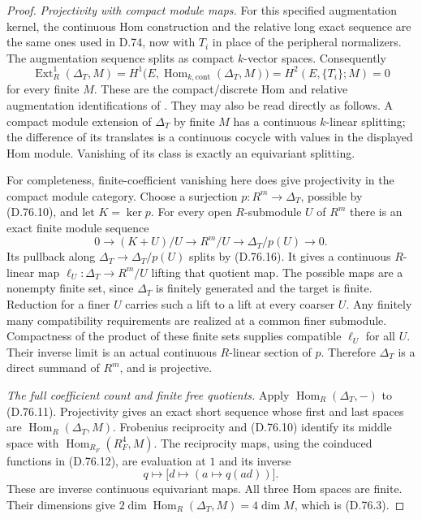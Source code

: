 \begin{proof}
\emph{Projectivity with compact module maps.}
For this specified augmentation kernel, the continuous
Hom construction and the relative long exact sequence
are the same ones used in D.74, now with $T_i$ in place
of the peripheral normalizers. The augmentation sequence
splits as compact $k$-vector spaces. Consequently
\[
 \operatorname{Ext}^1_R(\Delta_T,M)
   =H^1\bigl(E,\operatorname{Hom}_{k,\mathrm{cont}}(\Delta_T,M)\bigr)
   =H^2(E,\{T_i\};M)=0
                                                               \tag{D.76.16}
\]
for every finite $M$.
These are the compact/discrete Hom and relative
augmentation identifications of
\cite[Section~1 and Definition~2.1]{C-WilkesRelativeAccepted2018}.
They may also be read directly as follows. A compact
module extension of $\Delta_T$ by finite $M$ has a
continuous $k$-linear splitting; the difference of its
translates is a continuous cocycle with values in the
displayed Hom module. Vanishing of its class is
exactly an equivariant splitting.

For completeness, finite-coefficient vanishing here
does give projectivity in the compact module category.
Choose a surjection $p:R^m\to\Delta_T$, possible by
(D.76.10), and let $K=\ker p$.
For every open $R$-submodule $U$ of $R^m$ there is an
exact finite module sequence
\[
 0\longrightarrow (K+U)/U
 \longrightarrow R^m/U
 \longrightarrow\Delta_T/p(U)\longrightarrow0 .
                                                               \tag{D.76.17}
\]
Its pullback along $\Delta_T\to\Delta_T/p(U)$ splits
by (D.76.16). It gives a continuous $R$-linear map
$\ell_U:\Delta_T\to R^m/U$ lifting that quotient map.
The possible maps are a nonempty finite set, since
$\Delta_T$ is finitely generated and the target is finite.
Reduction for a finer $U$ carries such a lift to a
lift at every coarser $U$.
Any finitely many compatibility requirements are
realized at a common finer submodule. Compactness
of the product of these finite sets supplies compatible
$\ell_U$ for all $U$. Their inverse limit is an actual
continuous $R$-linear section of $p$.
Therefore $\Delta_T$ is a direct summand of $R^m$,
and is projective.

\emph{The full coefficient count and finite free quotients.}
Apply $\operatorname{Hom}_R(\Delta_T,-)$ to (D.76.11).
Projectivity gives an exact short sequence whose first
and last spaces are $\operatorname{Hom}_R(\Delta_T,M)$.
Frobenius reciprocity and (D.76.10) identify its middle
space with
$\operatorname{Hom}_{R_F}(R_F^4,M)$.
The reciprocity maps, using the coinduced functions in
(D.76.12), are evaluation at $1$ and its inverse
\[
        q\longmapsto
            \bigl[d\longmapsto(a\longmapsto q(ad))\bigr].
                                                               \tag{D.76.18}
\]
These are inverse continuous equivariant maps.
All three Hom spaces are finite. Their dimensions give
$2\dim\operatorname{Hom}_R(\Delta_T,M)=4\dim M$,
which is (D.76.3).


\end{proof}
